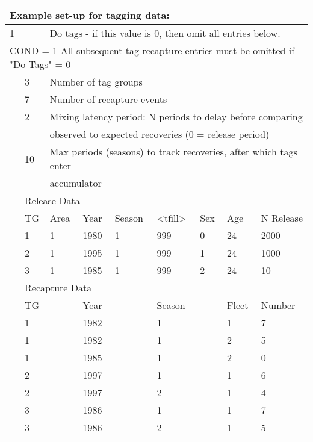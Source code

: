 \begin{center}
	\begin{tabular}{p{1.1cm} p{1.1cm} p{1.1cm} p{1.1cm} p{1.1cm} p{1.1cm} p{1.1cm} p{1.1cm} p{3cm}}
		\multicolumn{9}{l}{Example set-up for tagging data:}\\
		\hline
		1 & & \multicolumn{7}{l}{Do tags - if this value is 0, then omit all entries below.} \Tstrut\Bstrut\\
		\hline
		\multicolumn{9}{l}{COND = 1 All subsequent tag-recapture entries must be omitted if "Do Tags" = 0} \Tstrut\\

		 & 3 & \multicolumn{7}{l}{Number of tag groups}\Bstrut\\
		 \hline
		 & 7 & \multicolumn{7}{l}{Number of recapture events}\Tstrut\Bstrut\\
		 \hline
		 & 2 & \multicolumn{7}{l}{Mixing latency period: N periods to delay before comparing }\Tstrut\\
		 &   &  \multicolumn{7}{l}{observed to expected recoveries (0 = release period)}\Bstrut\\
		 \hline
		 & 10 & \multicolumn{7}{l}{Max periods (seasons) to track recoveries, after which tags enter}\Tstrut\\
		 &    & \multicolumn{7}{l}{ accumulator}\Bstrut\\
		 \hline
		 & \multicolumn{8}{l}{Release Data} \Tstrut\\
		 & TG & Area & Year & Season & <tfill> & Sex & Age & N Release\Bstrut\\ 
		 \hline
		 & 1 & 1 & 1980 & 1 & 999 & 0 & 24 & 2000 \Tstrut\\
		 & 2 & 1 & 1995 & 1 & 999 & 1 & 24 & 1000 \\
		 & 3 & 1 & 1985 & 1 & 999 & 2 & 24 & 10 \Bstrut\\
		 \hline
		 & \multicolumn{8}{l}{Recapture Data}\Tstrut\\
		 & TG &  & Year&  & Season &  & Fleet  & Number\Bstrut\\ 
		 \hline
		 & 1 & & 1982 & & 1 & & 1 & 7 \Tstrut\\
		 & 1 & & 1982 & & 1 & & 2 & 5 \\
		 & 1 & & 1985 & & 1 & & 2 & 0 \\
		 & 2 & & 1997 & & 1 & & 1 & 6 \\
		 & 2 & & 1997 & & 2 & & 1 & 4 \\
		 & 3 & & 1986 & & 1 & & 1 & 7 \\
		 & 3 & & 1986 & & 2 & & 1 & 5 \Bstrut\\
		 \hline
	\end{tabular}
\end{center}

